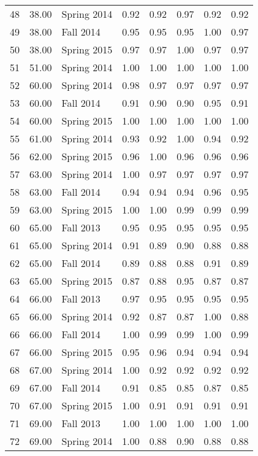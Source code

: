 \documentclass[12pt,]{article}
\begin{document}
\begin{longtable}{l|l|l|l|l|l|l|l}
  48 & 38.00 & Spring 2014 & 0.92 & 0.92 & 0.97 & 0.92 & 0.92 \\ 
  49 & 38.00 & Fall 2014 & 0.95 & 0.95 & 0.95 & 1.00 & 0.97 \\ 
  50 & 38.00 & Spring 2015 & 0.97 & 0.97 & 1.00 & 0.97 & 0.97 \\ 
  51 & 51.00 & Spring 2014 & 1.00 & 1.00 & 1.00 & 1.00 & 1.00 \\ 
  52 & 60.00 & Spring 2014 & 0.98 & 0.97 & 0.97 & 0.97 & 0.97 \\ 
  53 & 60.00 & Fall 2014 & 0.91 & 0.90 & 0.90 & 0.95 & 0.91 \\ 
  54 & 60.00 & Spring 2015 & 1.00 & 1.00 & 1.00 & 1.00 & 1.00 \\ 
  55 & 61.00 & Spring 2014 & 0.93 & 0.92 & 1.00 & 0.94 & 0.92 \\ 
  56 & 62.00 & Spring 2015 & 0.96 & 1.00 & 0.96 & 0.96 & 0.96 \\ 
  57 & 63.00 & Spring 2014 & 1.00 & 0.97 & 0.97 & 0.97 & 0.97 \\ 
  58 & 63.00 & Fall 2014 & 0.94 & 0.94 & 0.94 & 0.96 & 0.95 \\ 
  59 & 63.00 & Spring 2015 & 1.00 & 1.00 & 0.99 & 0.99 & 0.99 \\ 
  60 & 65.00 & Fall 2013 & 0.95 & 0.95 & 0.95 & 0.95 & 0.95 \\ 
  61 & 65.00 & Spring 2014 & 0.91 & 0.89 & 0.90 & 0.88 & 0.88 \\ 
  62 & 65.00 & Fall 2014 & 0.89 & 0.88 & 0.88 & 0.91 & 0.89 \\ 
  63 & 65.00 & Spring 2015 & 0.87 & 0.88 & 0.95 & 0.87 & 0.87 \\ 
  64 & 66.00 & Fall 2013 & 0.97 & 0.95 & 0.95 & 0.95 & 0.95 \\ 
  65 & 66.00 & Spring 2014 & 0.92 & 0.87 & 0.87 & 1.00 & 0.88 \\ 
  66 & 66.00 & Fall 2014 & 1.00 & 0.99 & 0.99 & 1.00 & 0.99 \\ 
  67 & 66.00 & Spring 2015 & 0.95 & 0.96 & 0.94 & 0.94 & 0.94 \\ 
  68 & 67.00 & Spring 2014 & 1.00 & 0.92 & 0.92 & 0.92 & 0.92 \\ 
  69 & 67.00 & Fall 2014 & 0.91 & 0.85 & 0.85 & 0.87 & 0.85 \\ 
  70 & 67.00 & Spring 2015 & 1.00 & 0.91 & 0.91 & 0.91 & 0.91 \\ 
  71 & 69.00 & Fall 2013 & 1.00 & 1.00 & 1.00 & 1.00 & 1.00 \\ 
  72 & 69.00 & Spring 2014 & 1.00 & 0.88 & 0.90 & 0.88 & 0.88 \\ 

\end{longtable}
\end{document}
